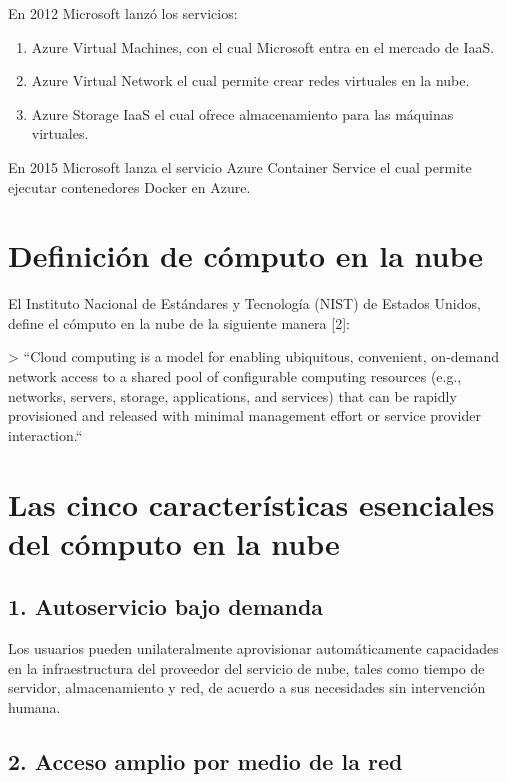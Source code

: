 \documentclass[11pt,a4paper,oneside]{book}
\begin{document}
En 2012 Microsoft lanzó los servicios:

\begin{enumerate}

\item Azure Virtual Machines, con el cual Microsoft entra en el mercado de IaaS.

\item Azure Virtual Network el cual permite crear redes virtuales en la nube.

\item Azure Storage IaaS el cual ofrece almacenamiento para las máquinas virtuales.

\end{enumerate}

En 2015 Microsoft lanza el servicio Azure Container Service el cual permite ejecutar contenedores Docker en Azure.

\section{Definición de cómputo en la nube}

El Instituto Nacional de Estándares y Tecnología (NIST) de Estados Unidos, define el cómputo en la nube de la siguiente manera [2]:

> ``Cloud computing is a model for enabling ubiquitous, convenient, on-demand network access to a shared pool of configurable computing resources (e.g., networks, servers, storage, applications, and services) that can be rapidly provisioned and released with minimal management effort or service provider interaction.``

\section{Las cinco características esenciales del cómputo en la nube}

\subsection{1. Autoservicio bajo demanda}

Los usuarios pueden unilateralmente aprovisionar automáticamente capacidades en la infraestructura del proveedor del servicio de nube, tales como tiempo de servidor, almacenamiento y red, de acuerdo a sus necesidades sin intervención humana.

\subsection{2. Acceso amplio por medio de la red}
\end{document}
